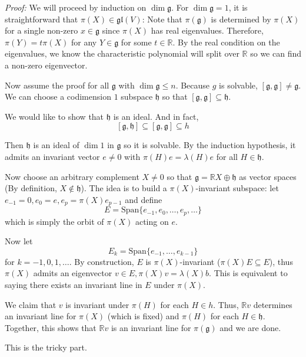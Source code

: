 \documentclass[12pt]{article}
\newcommand{\R}{\mathbb{R}}
\newcommand{\g}{\mathfrak{g}}
\newcommand{\h}{\mathfrak{h}}
\newcommand{\gl}{\mathfrak{gl}}
\newenvironment*{tbox}[2][gray]{
    \begin{tcolorbox}[
        parbox=false,
        colback=#1!5!white,
        colframe=#1!75!black,
        breakable,
        title={#2}
    ]}
    {\end{tcolorbox}}
\begin{document}
    \begin{tbox}{\textbf{Lie's Theorem:} Let $\g$ be a solvable lie algebra and let $\pi: \g \to \gl(V)$ be a representation of $\g$ such that the eigenvalues of $\pi(x)$ are real for each $X \in \g$. Then there exists a $v \neq 0 \in V$ so that $v$ is an eigenvector of $\pi(X)$ for all $X \in \g$.}

        \emph{Proof:} We will proceed by induction on $\dim \g$. For $\dim \g = 1$, it is straightforward that $\pi(X) \in \gl(V)$: Note that $\pi(\g)$ is determined by $\pi(X)$ for a single non-zero $x \in \g$ since $\pi(X)$ has real eigenvalues. Therefore, $\pi(Y)= t\pi(X)$ for any $Y \in \g$ for some $t \in \R$. By the real condition on the eigenvalues, we know the characteristic polynomial will split over $\R$ so we can find a non-zero eigenvector.

        Now assume the proof for all $\g$ with $\dim \g \leq n$. Because $g$ is solvable, $[\g, \g] \neq \g$. We can choose a codimension $1$ subspace $\h$ so that $[\g, \g] \subseteq \h$. 
        
        We would like to show that $\h$ is an ideal. And in fact, 
        \[[\g, \h] \subseteq [\g, \g] \subseteq h\]

        Then $\h$ is an ideal of $\dim 1$ in $\g$ so it is solvable. By the induction hypothesis, it admits an invariant vector $e \neq 0$ with $\pi(H)e = \lambda(H)e$ for all $H \in \h$.

        Now choose an arbitrary complement $X \neq 0$ so that $\g = \R X \oplus \h$ as vector spaces (By definition, $X \notin \h$). The idea is to build a $\pi(X)$-invariant subspace: let $e_{-1} = 0, e_{0} = e, e_p = \pi(X)e_{p-1}$ and define 
        \[E = \text{Span}\{e_{-1}, e_0, \dots, e_p, \dots\}\]
        which is simply the orbit of $\pi(X)$ acting on $e$. 

        Now let 
        \[E_k = \text{Span}\{e_{-1}, \dots, e_{k-1}\}\]
        for $k = -1, 0, 1, \dots$. By construction, $E$ is $\pi(X)$-invariant ($\pi(X)E \subseteq E$), thus $\pi(X)$ admits an eigenvector $v \in E, \pi(X)v = \lambda(X)b$. This is equivalent to saying there exists an invariant line in $E$ under $\pi(X)$.

        We claim that $v$ is invariant under $\pi(H)$ for each $H \in h$. Thus, $\R v$ determines an invariant line for $\pi(X)$ (which is fixed) and $\pi(H)$ for each $H \in \h$. Together, this shows that $\R v$ is an invariant line for $\pi(\g)$ and we are done. 

        This is the tricky part. 


\end{tbox}
\end{document}
